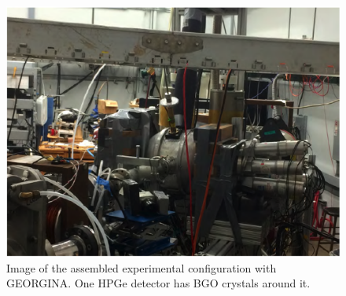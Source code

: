 \begin{figure}
    \centering
    \includegraphics[scale=0.6]{Setup_Figs/ICEBall-2014.png}
    \caption{Image of the assembled experimental configuration with GEORGINA. One HPGe detector has BGO crystals around it.}
    \label{fig:georgina_config}
\end{figure}